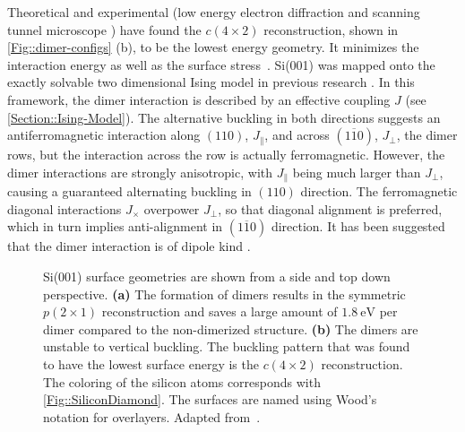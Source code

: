 	Theoretical \cite{ramstad1995theoretical, pillay2004revisit, inoue1994order, brand2023critical} and experimental (low energy electron diffraction \cite{matsumoto2003low, kubota1994streak, brand2023critical} and scanning tunnel microscope \cite{wolkow1992direct, tochihara1994low})  have found the $c(4\times2)$ reconstruction, shown in \autoref{Fig::dimer-configs} (b), to be the lowest energy geometry. It minimizes the interaction energy as well as the surface stress~\cite{pillay2004revisit}. Si(001) was mapped onto the exactly solvable two dimensional  Ising model in previous research \cite{brand2023dimer, pillay2004revisit, ihm1983structural, schaller2023sequential, inoue1994order}. In this framework, the dimer interaction is described by an effective coupling $J$ (see \autoref{Section::Ising-Model}). The alternative buckling in both directions suggests an antiferromagnetic interaction along $(110)$, $J_\parallel$, and across $(1\overline{1}0)$, $J_\perp$, the dimer rows, but the interaction across the row is actually ferromagnetic. However, the dimer interactions are strongly anisotropic, with $J_\parallel$ being much larger than $J_\perp$, causing a guaranteed alternating buckling in $(110)$ direction. The ferromagnetic diagonal interactions $J_\times$ overpower $J_\perp$, so that diagonal alignment is preferred, which in turn implies anti-alignment in $(1\overline{1}0)$ direction. It has been suggested that the dimer interaction is of dipole kind \cite{pillay2004revisit}.
	\begin{figure}[htb]
		\begin{subfigure}{0.5\textwidth}
			\centering
			
			\label{p(2x1)-symmetric}
		\end{subfigure}
		\begin{subfigure}{0.5\textwidth}
			\centering
			
			\label{c(4x2)}
		\end{subfigure}
		\caption{Si(001) surface geometries are shown from a side and top down perspective. \textbf{(a)} The formation of dimers results in the symmetric $p(2\times1)$ reconstruction and saves a large amount of $1.8~\text{eV}$ per dimer compared to the non-dimerized structure. \textbf{(b)} The dimers are unstable to vertical buckling. The buckling pattern that was found to have the lowest surface energy is the $c(4\times2)$ reconstruction. The coloring of the silicon atoms corresponds with \autoref{Fig::SiliconDiamond}. The surfaces are named using Wood's notation for overlayers. Adapted from~\cite{brand2023critical}.}
		\label{Fig::dimer-configs}
	\end{figure}
